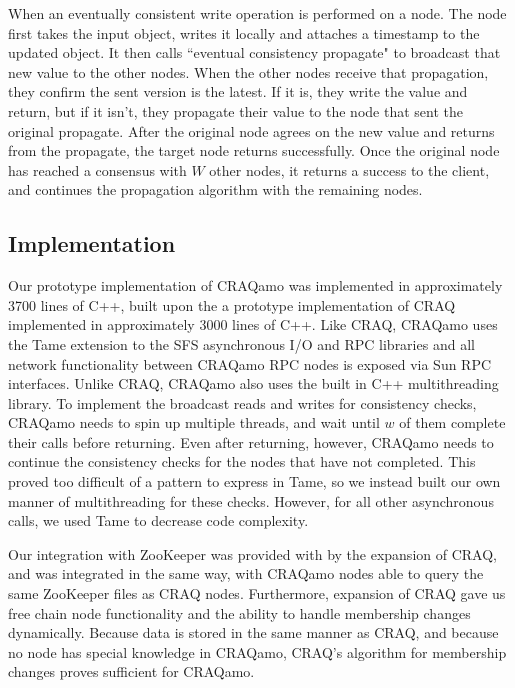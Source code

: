 When an eventually consistent write operation is performed on a node. The node first takes the input object, writes it locally and attaches a timestamp to the updated object. It then calls ``eventual consistency propagate" to broadcast that new value to the other nodes.  When the other nodes receive that propagation, they confirm the sent version is the latest.  If it is, they write the value and return, but if it isn't, they propagate their value to the node that sent the original propagate.  After the original node agrees on the new value and returns from the propagate, the target node returns successfully. Once the original node has reached a consensus with $W$ other nodes, it returns a success to the client, and continues the propagation algorithm with the remaining nodes. 

\subsection{Implementation}
Our prototype implementation of CRAQamo was implemented in approximately 3700 lines of C++,
built upon the a prototype implementation of CRAQ implemented in approximately 3000 lines of C++.
Like CRAQ, CRAQamo uses the Tame \cite{tame} extension to the SFS asynchronous I/O and RPC libraries \cite{sfs} and all network functionality between CRAQamo RPC nodes is exposed via Sun RPC interfaces.
Unlike CRAQ, CRAQamo also uses the built in C++ multithreading library.
To implement the broadcast reads and writes for consistency checks, CRAQamo needs to spin up multiple threads, and wait until $w$ of them complete their calls before returning.
Even after returning, however, CRAQamo needs to continue the consistency checks for the nodes that have not completed.
This proved too difficult of a pattern to express in Tame, so we instead built our own manner of multithreading for these checks.
However, for all other asynchronous calls, we used Tame to decrease code complexity.

Our integration with ZooKeeper was provided with by the expansion of CRAQ, and was integrated in the same way, with CRAQamo nodes able to query the same ZooKeeper files as CRAQ nodes.
Furthermore, expansion of CRAQ gave us free chain node functionality and the ability to handle membership changes dynamically.
Because data is stored in the same manner as CRAQ, and because no node has special knowledge in CRAQamo, CRAQ's algorithm for membership changes proves sufficient for CRAQamo.
